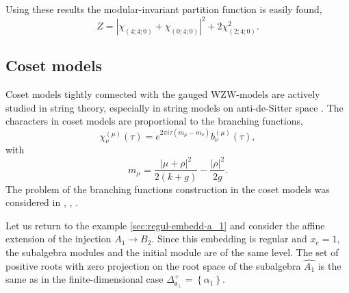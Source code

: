 \documentclass[12pt]{iopart}
\theoremstyle{definition}
\newcommand{\afb}{\mathfrak{a}_{\bot}}
\begin{document}
Using these results the modular-invariant partition function is easily found,
\begin{equation*}
  \label{eq:45}
  Z=\left|\chi_{(4;4;0)}+\chi_{(0;4;0)}\right|^2+2\chi_{(2;4;0)}^2.
\end{equation*}

\subsection{Coset models}
\label{sec:coset-models}

Coset models \cite{Goddard198588} tightly connected with the gauged WZW-models are actively studied
in string theory, especially in string models on anti-de-Sitter space
\cite{Maldacena:2000hw,Maldacena:2000kv,Maldacena:2001km,Maldacena:2001ky,Aharony:1999ti}.
The characters in coset models are proportional to the branching functions,
\begin{equation}
  \label{eq:31}
  \chi^{(\mu)}_{\nu}(\tau)=e^{2\pi i \tau (m_{\mu}-m_{\nu})} b^{(\mu)}_{\nu}(\tau),
\end{equation}
with
\begin{equation*}
  \label{eq:46}
  m_{\mu}=\frac{\left|\mu+\rho\right|^2}{2(k+g)}-\frac{\left|\rho\right|^2}{2g}.
\end{equation*}
The problem of the branching functions construction in the coset models was considered
in  \cite{Dunbar:1992gh}, \cite{Hwang:1994yr}, \cite{lu1994branching}.

Let us return to the example \ref{sec:regul-embedd-a_1} and consider the affine extension of the injection
$A_1 \rightarrow B_2$.
Since this embedding is regular and $x_e=1$, the subalgebra modules and the initial module are of the same level.
The set  of positive roots with zero projection
on the root space of the subalgebra $\hat{A_1}$ is the same as in the finite-dimensional case
$\Delta^{+}_{\afb}=\left\{ \alpha_1 \right\}$.
\end{document}

